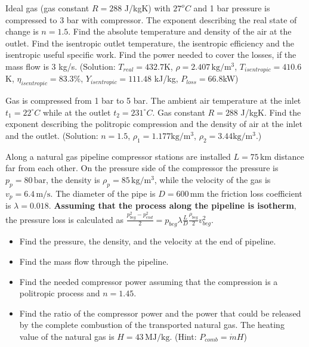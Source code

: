 \vspace{1cm}

Ideal gas (gas constant $R=288$ J/kgK) with $27^oC$ and 1 bar pressure is compressed to 3 bar with compressor. The exponent describing the real state of change is $n = 1.5$. Find the absolute temperature and density of the air at the outlet. Find the isentropic outlet temperature, the isentropic efficiency and the isentropic useful specific work. Find the power needed to cover the losses, if the mass flow is 3 kg/s. (Solution: $T_{real}=432.7$K, $\rho=2.407\,\mathrm{kg/m^3}$, $T_{isentropic}=410.6$K, $\eta_{isentropic}=83.3$\%,  $Y_{isentropic}=111.48$ kJ/kg, $P_{loss}=66.8$kW)

\vspace{1cm}

Gas is compressed from 1 bar to 5 bar. The ambient air temperature at the inlet $t_1=22^{\circ}C$ while at the outlet $t_2=231^{\circ}C$. Gas constant $R=288$ J/kgK. Find the exponent describing the politropic compression and the density of air at the inlet and the outlet. (Solution: $n=1.5$, $\rho_1=1.177 \mathrm{kg/m^3}$, $\rho_2=3.44 \mathrm{kg/m^3}$.)

\vspace{1cm}

Along a natural gas pipeline compressor stations are installed $L=75\,\mathrm{km}$ distance far from each other. On the pressure side of the compressor the pressure is $p_p=80\,\mathrm{bar}$, the density is $\rho_p=85\,\mathrm{kg/m^3}$, while the velocity of the gas is $v_p=6.4\,\mathrm{m/s}$. The diameter of the pipe is $D=600\,\mathrm{mm}$ the friction loss coefficient is $\lambda=0.018$. \textbf{Assuming that the process along the pipeline is isotherm}, the pressure loss is calculated as $\frac{p_{beg}^2-p_{end}^2}{2}=p_{beg}\lambda \frac{L}{D}\frac{\rho_{beg}}{2}v_{beg}^2$.

\begin{itemize}
\item Find the pressure, the density, and the velocity at the end of pipeline.
\item Find the mass flow through the pipeline.
\item Find the needed compressor power assuming that the compression is a politropic process and $n=1.45$.
\item Find the ratio of the compressor power and the power that could be released by the complete combustion of the transported natural gas. The heating value of the natural gas is $H=43\,\mathrm{MJ/kg}$. (Hint: $P_{comb}=\dot{m}H$)
\end{itemize}

